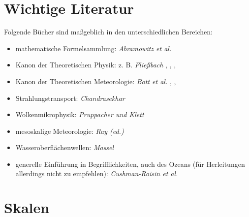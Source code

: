 \documentclass{book}
\begin{document}
\section{Wichtige Literatur}
\label{sec:important_literatur}

Folgende Bücher sind maßgeblich in den unterschiedlichen Bereichen:

\begin{itemize}
\item mathematische Formelsammlung: \textit{Abramowitz et al.} \cite{abramowitz}
\item Kanon der Theoretischen Physik: z. B. \textit{Fließbach} \cite{fliessbach_theo_1}, \cite{fliessbach_theo_2}, \cite{fliessbach_theo_3}, \cite{fliessbach_theo_4}
\item Kanon der Theoretischen Meteorologie: \textit{Bott et al.} \cite{bott_dynamics}, \cite{bott_thermodynamics}, \cite{bott_radiation}
\item Strahlungstransport: \textit{Chandrasekhar} \cite{chandrasekhar}
\item Wolkenmikrophysik: \textit{Pruppacher und Klett} \cite{pruppacher_klett}
\item mesoskalige Meteorologie: \textit{Ray (ed.)} \cite{mesoscale}
\item Wasseroberflächenwellen: \textit{Massel} \cite{surface_waves}
\item generelle Einführung in Begrifflichkeiten, auch des Ozeans (für Herleitungen allerdings nicht zu empfehlen): \textit{Cushman-Roisin et al.} \cite{cushman}
\end{itemize}

\section{Skalen}
\label{sec:skalen}
\end{document}
